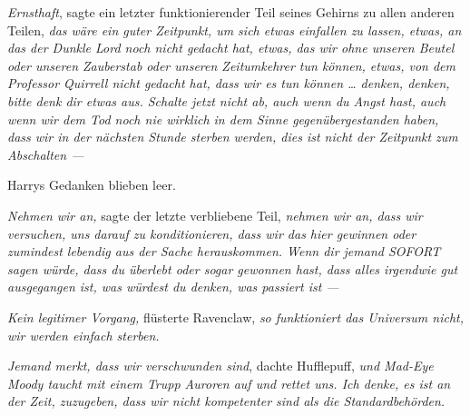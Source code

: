 \emph{Ernsthaft}, sagte ein letzter funktionierender Teil seines Gehirns zu allen anderen Teilen, \emph{das wäre ein guter Zeitpunkt, um sich etwas einfallen zu lassen, etwas, an das der Dunkle Lord noch nicht gedacht hat, etwas, das wir ohne unseren Beutel oder unseren Zauberstab oder unseren Zeitumkehrer tun können, etwas, von dem Professor Quirrell nicht gedacht hat, dass wir es tun können … denken, denken, bitte denk dir etwas aus. Schalte jetzt nicht ab, auch wenn du Angst hast, auch wenn wir dem Tod noch nie wirklich in dem Sinne gegenübergestanden haben, dass wir in der nächsten Stunde sterben werden, \emph{dies ist nicht der Zeitpunkt zum Abschalten —}}

Harrys Gedanken blieben leer.

\emph{Nehmen wir an,} sagte der letzte verbliebene Teil, \emph{nehmen wir an, dass wir versuchen, uns darauf zu konditionieren, dass wir das hier gewinnen oder zumindest lebendig aus der Sache herauskommen. Wenn dir jemand SOFORT sagen würde, dass du überlebt oder sogar gewonnen hast, dass alles irgendwie gut ausgegangen ist, was würdest du denken, was passiert ist —}

\emph{Kein legitimer Vorgang,} flüsterte Ravenclaw, \emph{so funktioniert das Universum nicht, wir werden einfach sterben.}

\emph{Jemand merkt, dass wir verschwunden sind}, dachte Hufflepuff, \emph{und Mad-Eye Moody taucht mit einem Trupp Auroren auf und rettet uns. Ich denke, es ist an der Zeit, zuzugeben, dass wir nicht kompetenter sind als die Standardbehörden.}

